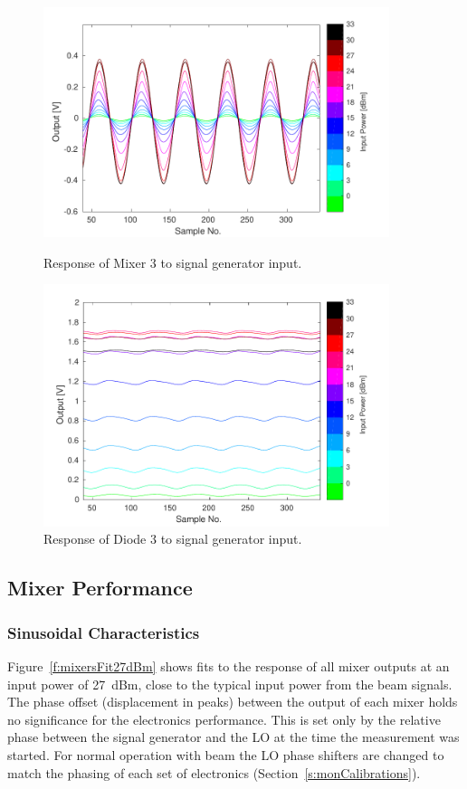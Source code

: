 \begin{figure}
  \centering
  \includegraphics[width=0.9\textwidth]{Figures/phaseMons/Mixer3_AllPowerLevels}
  \caption{Response of Mixer 3 to signal generator input.}
  \label{f:sigGenAllMix3}
  \includegraphics[width=0.9\textwidth]{Figures/phaseMons/Diode3_AllPowerLevels}
  \caption{Response of Diode 3 to signal generator input.}
  \label{f:sigGenAllDio3}
\end{figure}

\subsection{Mixer Performance}
\label{ss:sigGenMixer}

\subsubsection{Sinusoidal Characteristics}

Figure~\ref{f:mixersFit27dBm} shows fits to the response of all mixer outputs at an input power of 27~dBm, close to the typical input power from the beam signals. The phase offset (displacement in peaks) between the output of each mixer holds no significance for the electronics performance. This is set only by the relative phase between the signal generator and the LO at the time the measurement was started. For normal operation with beam the LO phase shifters are changed to match the phasing of each set of electronics (Section~\ref{s:monCalibrations}).

